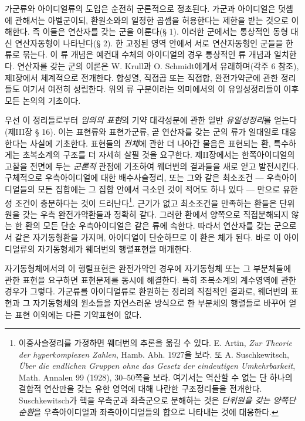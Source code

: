 가군류와 아이디얼류의 도입은 순전히 군론적으로 정초된다. 가군과 아이디얼은 덧셈에 관해서는 아벨군이되, 환원소와의 일정한 곱셈을 허용한다는 제한을 받는 것으로 이해한다. 즉 이들은 \glqq{}연산자를 갖는 군\grqq{}을 이룬다(§ 1). 이러한 군에서는 통상적인 동형 대신 \glqq{}연산자동형\grqq{}이 나타난다(§ 2). 한 고정된 영역 안에서 서로 연산자동형인 군들을 한 류로 묶는다. 이 류 개념은 예컨대 수체의 아이디얼의 경우 통상적인 류 개념과 일치한다. 연산자를 갖는 군의 이론은 W. Krull과 O. Schmidt에게서 유래하며(각주 6 참조), 제I장에서 체계적으로 전개한다. 합성열, 직접곱 또는 직접합, 완전가약군에 관한 정리들도 여기서 여전히 성립한다. 위의 류 구분이라는 의미에서의 이 유일성정리들이 이후 모든 논의의 기초이다.

우선 이 정리들로부터 \emph{임의의 표현}의 기약 대각성분에 관한 일반 \emph{유일성정리}를 얻는다(제III장 § 16). 이는 표현류와 표현가군류, 곧 연산자를 갖는 군의 류가 일대일로 대응한다는 사실에 기초한다. 표현들의 \emph{전체}에 관한 더 나아간 물음은 표현되는 환, 특수하게는 초복소계의 구조를 더 자세히 살필 것을 요구한다. 제II장에서는 한쪽아이디얼의 고찰을 전면에 두는 \emph{군론적} 관점에 기초하여 웨더번의 결과들을 새로 얻고 발전시킨다. 구체적으로 우측아이디얼에 대한 \glqq{}배수사슬정리\grqq{}, 또는 그와 같은 \glqq{}최소조건\grqq{} --- 우측아이디얼들의 모든 집합에는 그 집합 안에서 극소인 것이 적어도 하나 있다 --- 만으로 유한성 조건이 충분하다는 것이 드러난다\footnote{\glqq{}이중사슬정리\grqq{}를 가정하면 웨더번의 추론을 옮길 수 있다. E. Artin, \emph{Zur Theorie der hyperkomplexen Zahlen}, Hamb. Abh. 1927을 보라. 또 A. Suschkewitsch, \emph{Über die endlichen Gruppen ohne das Gesetz der eindeutigen Umkehrbarkeit}, Math. Annalen 99 (1928), 30--50쪽을 보라. 여기서는 역산할 수 없는 단 하나의 결합적 연산만을 갖는 유한 영역에 대해 나란한 구조정리들을 전개한다. Suschkewitsch가 \glqq{}핵\grqq{}을 우측군과 좌측군으로 분해하는 것은 \emph{단위원을 갖는 양쪽단순환}을 우측아이디얼과 좌측아이디얼들의 합으로 나타내는 것에 대응한다.}. 근기가 없고 최소조건을 만족하는 환들은 단위원을 갖는 우측 완전가약환들과 정확히 같다. 그러한 환에서 양쪽으로 직접분해되지 않는 한 환의 모든 단순 우측아이디얼은 같은 류에 속한다. 따라서 연산자를 갖는 군으로서 같은 자기동형환을 가지며, 아이디얼이 단순하므로 이 환은 체가 된다. 바로 이 아이디얼류의 자기동형체가 웨더번의 행렬표현을 매개한다.

자기동형체에서의 이 행렬표현은 완전가약인 경우에 자기동형체 또는 그 부분체들에 관한 표현을 요구하면 표현문제를 동시에 해결한다. 특히 초복소계의 계수영역에 관한 경우가 그렇다. 가군류를 아이디얼류로 환원하는 정리의 직접적인 결과로, 웨더번의 표현과 그 자기동형체의 원소들을 자연스러운 방식으로 한 부분체의 행렬들로 바꾸어 얻는 표현 이외에는 다른 기약표현이 없다.

